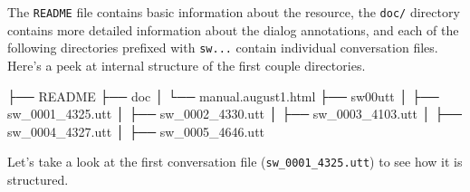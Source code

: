 \documentclass[
]{article}
\newenvironment{Shaded}{\begin{snugshade}}{\end{snugshade}}
\newcommand{\ExtensionTok}[1]{#1}
\newcommand{\NormalTok}[1]{#1}
\begin{document}
The \texttt{README} file contains basic information about the resource, the \texttt{doc/} directory contains more detailed information about the dialog annotations, and each of the following directories prefixed with \texttt{sw...} contain individual conversation files. Here's a peek at internal structure of the first couple directories.

\begin{Shaded}
\begin{Highlighting}[]
\ExtensionTok{├──}\NormalTok{ README}
\ExtensionTok{├──}\NormalTok{ doc}
\ExtensionTok{│}\NormalTok{   └── manual.august1.html}
\ExtensionTok{├──}\NormalTok{ sw00utt}
\ExtensionTok{│}\NormalTok{   ├── sw\_0001\_4325.utt}
\ExtensionTok{│}\NormalTok{   ├── sw\_0002\_4330.utt}
\ExtensionTok{│}\NormalTok{   ├── sw\_0003\_4103.utt}
\ExtensionTok{│}\NormalTok{   ├── sw\_0004\_4327.utt}
\ExtensionTok{│}\NormalTok{   ├── sw\_0005\_4646.utt}
\end{Highlighting}
\end{Shaded}

Let's take a look at the first conversation file (\texttt{sw\_0001\_4325.utt}) to see how it is structured.
\end{document}
